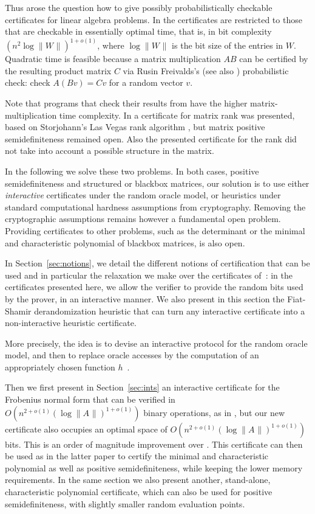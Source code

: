 \documentclass{article}
\newcommand{\bigO}[1]{\ensuremath{O(#1)}\xspace}
\newcommand{\psdness}{positive semidefiniteness\xspace}
\newcommand{\lognormW}{\log\| W\mspace{1mu} \|}
\newcommand{\lognormA}{\log\| A\mspace{1mu} \|}
\begin{document}
Thus arose the question how to give possibly probabilistically checkable
certificates for linear algebra problems.
In \cite{Kaltofen:2011:quadcert} the certificates are restricted to those that
are checkable in essentially optimal time, that is, in bit complexity 
$(n^2 \lognormW)^{1+o(1)}$, 
where $\lognormW$ is the bit size of the entries in $W${}.
Quadratic time is feasible because a matrix multiplication $AB$ can be certified
by the resulting product matrix $C$ via Rusin Freivalds's
\cite{Freivalds:1979:certif} (see also \cite{Kimbrel:1993:PAV}) probabilistic
check: check $A(B v) = C v$ for a random vector $v${}.

Note that programs that check their results from \cite{Blum:1995:checkwork}
have the higher matrix-multiplication time complexity. 
In \cite{Kaltofen:2011:quadcert} a certificate for matrix
rank was presented, based on Storjohann's Las Vegas rank algorithm
\cite{Storjohann:2009:IMR}, but matrix \psdness remained open.  
Also the presented certificate for the rank did not take into account a possible
structure in the matrix.

 
In the following we solve these two problems.
In both cases, \psdness and structured or blackbox matrices, our solution is to
use either {\em interactive} certificates under the random oracle model, or
heuristics under standard computational hardness assumptions from cryptography. 
Removing the cryptographic assumptions remains however a fundamental open
problem. Providing certificates to other problems, such as the determinant or
the minimal and characteristic polynomial of blackbox matrices, is also open.

In Section~\ref{sec:notions},
we detail the different notions of certification that can be used and in
particular the relaxation we make over the certificates
of~\cite{Kaltofen:2011:quadcert}: in the certificates presented here, we allow
the verifier to provide the random bits used by the prover, in an interactive
manner.
We also present in this section the Fiat-Shamir derandomization heuristic that
can turn any interactive certificate into a non-interactive heuristic
certificate.
 
More precisely, the idea is to devise an interactive protocol for the random
oracle model, and then to replace oracle accesses by the computation of an
appropriately chosen function
$h$~\cite{Fiat:1986:Shamir,Bellare:1993:randomoracle}.

 
Then we first present in Section~\ref{sec:ints} an interactive certificate for
the Frobenius normal form that can be verified in
$\bigO{n^{2+o(1)}(\lognormA)^{1+o(1)}}$ binary operations, as in
\cite{Kaltofen:2011:quadcert}, but our new certificate also occupies an optimal
space of $\bigO{n^{2+o(1)}(\lognormA)^{1+o(1)}}$ bits. 
This is an order of magnitude improvement over
\cite[Theorem~4]{Kaltofen:2011:quadcert}.  
This certificate can then be used as in the latter paper to certify the minimal
and characteristic polynomial as well as \psdness, while keeping the lower
memory requirements. In the same section we also present another, stand-alone,
characteristic polynomial certificate, which can also be used for \psdness, with
slightly smaller random evaluation points.
\end{document}
